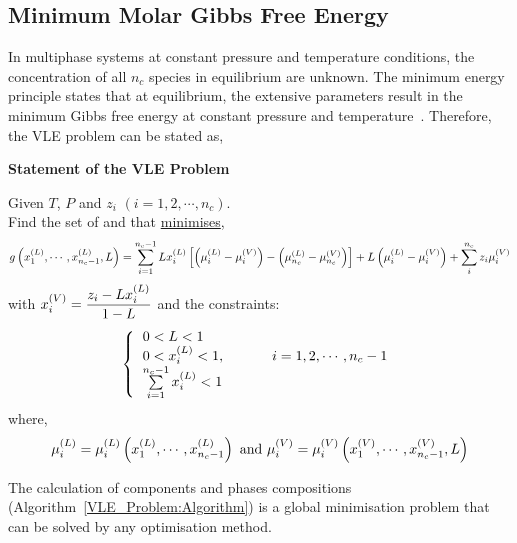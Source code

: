 \subsection{Minimum Molar Gibbs Free Energy}\label{Chapter:ThermodynamicFormulation:Section:MinimumGibbsEnergy}
In multiphase systems at constant pressure and temperature conditions, the concentration of all $n_{c}$ species in equilibrium are unknown. The minimum energy principle states that at equilibrium, the extensive parameters result in the minimum Gibbs free energy at constant pressure and temperature~\citep{Callen_Book}. Therefore, the VLE problem can be stated as,
\begin{algorithm}
\begin{shaded}
   \begin{center}
     {\bf Statement of the VLE Problem}
   \end{center}

   Given $T$, $P$ and $z_{i}$ $\left(i=1,2,\cdots,n_{c}\right)$. \\
   Find the set of  and  that \underline{minimises},   \begin{displaymath}
      g\left(\mfr[x]{1}{L},\cdots,\mfr[x]{n_{c}-1}{L}, L\right) = \summation_{i=1}^{n_{c}-1}L\mfr[x]{i}{L}\left[\left(\mfr[\mu]{i}{L}-\mfr[\mu]{i}{V}\right)-\left(\mfr[\mu]{n_{c}}{L}-\mfr[\mu]{n_{c}}{V}\right)\right] + L\left(\mfr[\mu]{i}{L}-\mfr[\mu]{i}{V}\right) + \summation_{i}^{n_{c}}z_{i}\mfr[\mu]{i}{V} 
   \end{displaymath}
   with $\mfr[x]{i}{V} = \frc{z_{i}-L\mfr[x]{i}{L}}{1-L}$ and the constraints:
\[ 
\left\{
  \begin{tabular}{l}
  $0 < L < 1$ \\
  $0 < \mfr[x]{i}{L} < 1$, \hspace{1cm} $i=1,2,\cdots,n_{c}-1$\\
  $\summation_{i=1}^{n_{c}-1}\mfr[x]{i}{L} < 1$\\ 
  \end{tabular}
\right.
\]
where,
\begin{displaymath}
   \mfr[\mu]{i}{L}=\mfr[\mu]{i}{L}\left(\mfr[x]{1}{L},\cdots,\mfr[x]{n_{c}-1}{L}\right)\text{ and }\mfr[\mu]{i}{V}=\mfr[\mu]{i}{V}\left(\mfr[x]{1}{V},\cdots,\mfr[x]{n_{c}-1}{V}, L\right)
\end{displaymath}

\end{shaded}
\label{VLE_Problem:Algorithm}\caption{Vapour-liquid equibrium problem.}
\end{algorithm}
The calculation of components and phases compositions (Algorithm~\ref{VLE_Problem:Algorithm}) is a global minimisation problem that can be solved by any optimisation method. %


